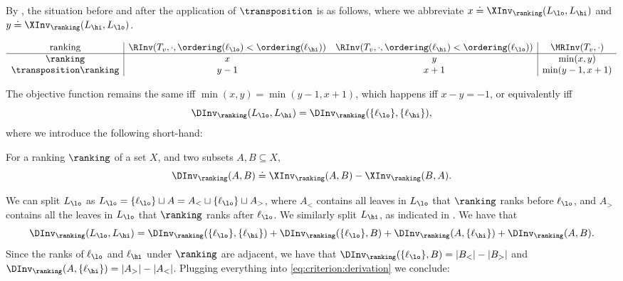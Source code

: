 \documentclass{toc}
\begin{document}
By , the situation before and after the application of $\transposition$ is as follows, where we abbreviate $x \doteq \XInv_\ranking(L_\lo,L_\hi)$ and $y \doteq \XInv_\ranking(L_\hi,L_\lo)$. 

\begin{equation*}
    \begin{array}{c|cc|c}
      \text{ranking} & \RInv(T_v,\cdot, \ordering(\ell_\lo) < \ordering(\ell_\hi)) &  \RInv(T_v,\cdot, \ordering(\ell_\hi) < \ordering(\ell_\lo)) & \MRInv(T_v,\cdot) \\
      \hline
      \ranking & x & y & \min(x,y) \\
      \transposition \ranking & y-1 & x+1 & \min(y-1,x+1)
    \end{array}
\end{equation*}

The objective function remains the same iff $\min(x,y) = \min(y-1,x+1)$, which happens iff $x-y=-1$, or equivalently iff
\begin{equation}\label{eq:criterion:derivation}
\DInv_\ranking(L_\lo,L_\hi) = \DInv_\ranking(\{\ell_\lo\},\{\ell_\hi\}),
\end{equation}
where we introduce the following short-hand: 
\begin{definition}
For a ranking $\ranking$ of a set $X$, and two subsets $A, B \subseteq X$,
\[ \DInv_\ranking(A,B) \doteq \XInv_\ranking(A,B) - \XInv_\ranking(B,A). \]
\end{definition}
We can split $L_\lo$ as $L_\lo = \{\ell_\lo\} \sqcup A = A_< \sqcup \{\ell_\lo\} \sqcup A_>$, where $A_<$ contains all leaves in $L_\lo$ that $\ranking$ ranks before $\ell_\lo$, and $A_>$ contains all the leaves in $L_\lo$ that $\ranking$ ranks after $\ell_\lo$. We similarly split $L_\hi$, as indicated in . We have that
\[ \DInv_\ranking(L_\lo,L_\hi) = \DInv_\ranking(\{\ell_\lo\},\{\ell_\hi\}) + \DInv_\ranking(\{\ell_\lo\},B) + \DInv_\ranking(A,\{\ell_\hi\}) + \DInv_\ranking(A,B).\]
Since the ranks of $\ell_\lo$ and $\ell_\hi$ under $\ranking$ are adjacent, we have that $\DInv_\ranking(\{\ell_\lo\},B) = |B_<| - |B_>|$ and $\DInv_\ranking(A,\{\ell_\hi\}) = |A_>| - |A_<|$. Plugging everything into \eqref{eq:criterion:derivation} we conclude:
\end{document}
